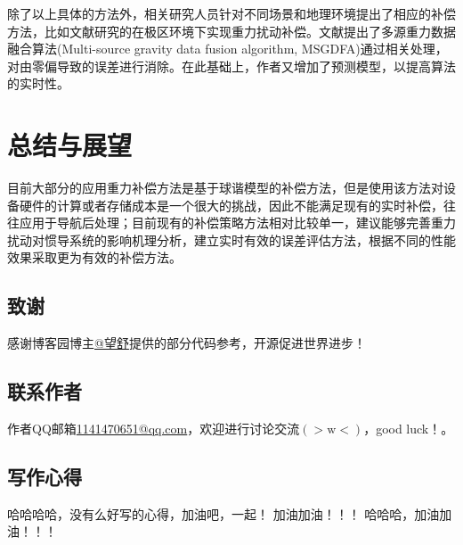 \documentclass[12pt,a4,utf8]{article}
\begin{document}
除了以上具体的方法外，相关研究人员针对不同场景和地理环境提出了相应的补偿方法，比如文献\cite{LIQIAN2022}研究的在极区环境下实现重力扰动补偿。文献\cite{LUOKAIXIN2023}提出了多源重力数据融合算法(Multi-source gravity data fusion algorithm, MSGDFA)通过相关处理，对由零偏导致的误差进行消除。在此基础上，作者又增加了预测模型，以提高算法的实时性。
\section{总结与展望}
目前大部分的应用重力补偿方法是基于球谐模型的补偿方法，但是使用该方法对设备硬件的计算或者存储成本是一个很大的挑战，因此不能满足现有的实时补偿，往往应用于导航后处理；目前现有的补偿策略方法相对比较单一，建议能够完善重力扰动对惯导系统的影响机理分析，建立实时有效的误差评估方法，根据不同的性能效果采取更为有效的补偿方法。

\newpage
\subsection{致谢}
感谢博客园博主\href{https://www.cnblogs.com/huangliu1111/p/13625826.html}{@望舒}提供的部分代码参考，开源促进世界进步！
\subsection{联系作者}
作者QQ邮箱\href{https://wx.mail.qq.com/?cancel_login=true&from=get_ticket_fail}{1141470651@qq.com}，欢迎进行讨论交流$(>\text{w}<)$，good luck！。

\subsection{写作心得}
哈哈哈哈，没有么好写的心得，加油吧，一起！
加油加油！！！
哈哈哈，加油加油！！！

\end{document}
